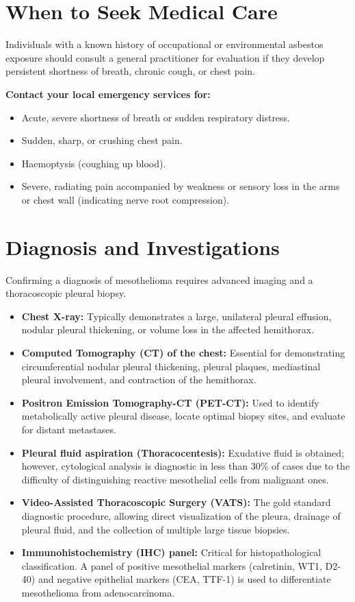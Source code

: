 \section*{When to Seek Medical Care}
Individuals with a known history of occupational or environmental asbestos exposure should consult a general practitioner for evaluation if they develop persistent shortness of breath, chronic cough, or chest pain.

\textbf{Contact your local emergency services for:}
\begin{itemize}
    \item Acute, severe shortness of breath or sudden respiratory distress.
    \item Sudden, sharp, or crushing chest pain.
    \item Haemoptysis (coughing up blood).
    \item Severe, radiating pain accompanied by weakness or sensory loss in the arms or chest wall (indicating nerve root compression).
\end{itemize}

\section*{Diagnosis and Investigations}
Confirming a diagnosis of mesothelioma requires advanced imaging and a thoracoscopic pleural biopsy.
\begin{itemize}
    \item \textbf{Chest X-ray:} Typically demonstrates a large, unilateral pleural effusion, nodular pleural thickening, or volume loss in the affected hemithorax.
    \item \textbf{Computed Tomography (CT) of the chest:} Essential for demonstrating circumferential nodular pleural thickening, pleural plaques, mediastinal pleural involvement, and contraction of the hemithorax.
    \item \textbf{Positron Emission Tomography-CT (PET-CT):} Used to identify metabolically active pleural disease, locate optimal biopsy sites, and evaluate for distant metastases.
    \item \textbf{Pleural fluid aspiration (Thoracocentesis):} Exudative fluid is obtained; however, cytological analysis is diagnostic in less than 30\% of cases due to the difficulty of distinguishing reactive mesothelial cells from malignant ones.
    \item \textbf{Video-Assisted Thoracoscopic Surgery (VATS):} The gold standard diagnostic procedure, allowing direct visualization of the pleura, drainage of pleural fluid, and the collection of multiple large tissue biopsies.
    \item \textbf{Immunohistochemistry (IHC) panel:} Critical for histopathological classification. A panel of positive mesothelial markers (calretinin, WT1, D2-40) and negative epithelial markers (CEA, TTF-1) is used to differentiate mesothelioma from adenocarcinoma.
\end{itemize}

